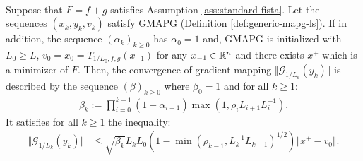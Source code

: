 \documentclass[12pt]{report}
\begin{document}
        \begin{theorem}\;\label{thm:gmapg-generic-gradmap-convergence}\\
            Suppose that $F = f + g$ satisfies Assumption \ref{ass:standard-fista}. 
            Let the sequences $(x_k, y_k, v_k)$ satisfy GMAPG (Definition \ref{def:generic-mapg-ls}). 
            If in addition, the sequence $(\alpha_k)_{k \ge 0}$ has $\alpha_0 = 1$ and, GMAPG is initialized with $L_0 \ge L$, $v_0=x_0 = T_{1/L_0, f, g}(x_{-1})$ for any $x_{-1} \in\mathbb R^n$ and there exists $x^+$ which is a minimizer of $F$. 
            Then, the convergence of gradient mapping $\Vert \mathcal G_{1/L_k}(y_k)\Vert$ is described by the sequence $(\beta)_{k \ge 0}$ where $\beta_0 = 1$ and for all $k \ge 1$:
            \begin{align*}
                \beta_k := \prod_{i = 0}^{k - 1}(1 - \alpha_{i + 1}) \max\left(1, \rho_i L_{i + 1}L_i^{-1}\right). 
            \end{align*}
            It satisfies for all $k \ge 1$ the inequality:
            \begin{align*}
                \Vert \mathcal G_{1/L_k} (y_k)\Vert &\le 
                \sqrt{\beta_k}L_k L_0 \left(
                    1 - 
                    \min(\rho_{k - 1}, L_k^{-1} L_{k - 1})^{1/2}
                \right)\Vert x^+ - v_0\Vert. 
            \end{align*}
        \end{theorem}
\end{document}
